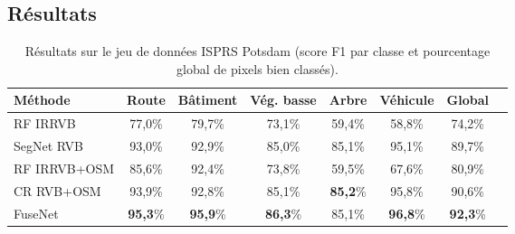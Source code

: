 
\subsection{Résultats}

\begin{table*}[t]
	\caption{Résultats sur le jeu de données ISPRS Potsdam (score F1 par classe et pourcentage global de pixels bien classés).}
    \label{table_potsdam_results}
	\begin{tabularx}{\textwidth}{Y c c c c c c c}
    \toprule
    Méthode                 & Route     & Bâtiment& Vég. basse  & Arbre   & Véhicule & Global\\
    \midrule
    RF \gls{IRRVB}          & 77,0\%    & 79,7\%  & 73,1\%      & 59,4\%  & 58,8\%   & 74,2\%\\
    SegNet \gls{RVB}        & 93,0\%    &	92,9\%	&	85,0\%      &	85,1\%  &	95,1\%	 & 89,7\%\\
    \midrule
    RF \gls{IRRVB}+\gls{OSM}& 85,6\%    & 92,4\%  & 73,8\%      & 59,5\%  & 67,6\%   & 80,9\%\\
    CR \gls{RVB}+\gls{OSM}  &	93,9\%    &	92,8\%	&	85,1\%		  &	\textbf{85,2}\%    &	95,8\%	&	90,6\%\\
    FuseNet                 &	\textbf{95,3}\%	&	\textbf{95,9}\%	&	\textbf{86,3}\%	   &	85,1\%	&	\textbf{96,8}\%	&	\textbf{92,3}\%\\
    \bottomrule
    \end{tabularx}
\end{table*}


